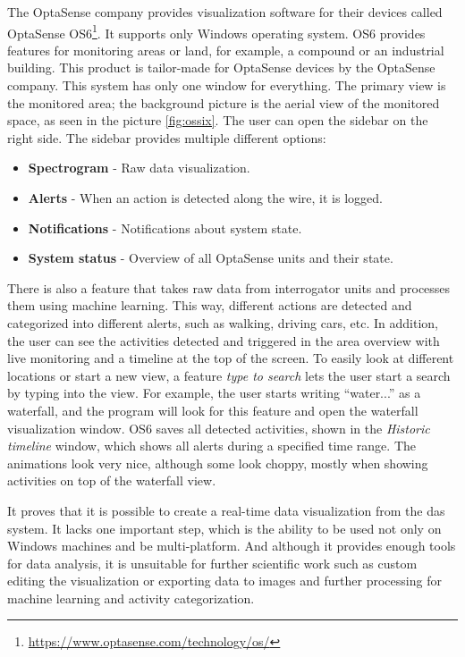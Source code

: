 The OptaSense company provides visualization software for their devices called OptaSense OS6\footnote{\url{https://www.optasense.com/technology/os/}}. It supports only Windows operating system. OS6 provides features for monitoring areas or land, for example, a compound or an industrial building. This product is tailor-made for OptaSense devices by the OptaSense company. This system has only one window for everything. The primary view is the monitored area; the background picture is the aerial view of the monitored space, as seen in the picture \ref{fig:ossix}. The user can open the sidebar on the right side. The sidebar provides multiple different options:

\begin{itemize}
    \item \textbf{Spectrogram} - Raw data visualization.
    \item \textbf{Alerts} - When an action is detected along the wire, it is logged.
    \item \textbf{Notifications} -  Notifications about system state.
    \item \textbf{System status} - Overview of all OptaSense units and their state.
\end{itemize}

There is also a feature that takes raw data from interrogator units and processes them using machine learning. This way, different actions are detected and categorized into different alerts, such as walking, driving cars, etc. In addition, the user can see the activities detected and triggered in the area overview with live monitoring and a timeline at the top of the screen. To easily look at different locations or start a new view, a feature \textit{type to search} lets the user start a search by typing into the view. For example, the user starts writing ``water...'' as a waterfall, and the program will look for this feature and open the waterfall visualization window. OS6 saves all detected activities, shown in the \textit{Historic timeline} window, which shows all alerts during a specified time range. The animations look very nice, although some look choppy, mostly when showing activities on top of the waterfall view. 

It proves that it is possible to create a real-time data visualization from the \ac{das} system. It lacks one important step, which is the ability to be used not only on Windows machines and be multi-platform. And although it provides enough tools for data analysis, it is unsuitable for further scientific work such as custom editing the visualization or exporting data to images and further processing for machine learning and activity categorization.

